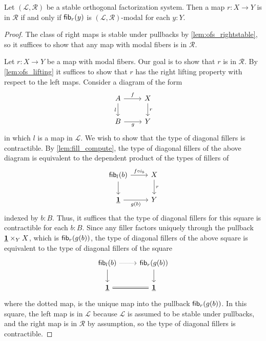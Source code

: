 \begin{lem}\label{lem:sofs_rfib}
Let $(\mathcal{L},\mathcal{R})$ be a stable orthogonal factorization system.
Then a map $r:X\to Y$ is in $\mathcal{R}$ if and only if $\mathsf{fib}_{r}(y)$
is $(\mathcal{L},\mathcal{R})$-modal for each $y:Y$.
\end{lem}

\begin{proof}
The class of right maps is stable under pullbacks by \autoref{lem:ofs_rightstable},
so it suffices to show that any map with modal fibers is in $\mathcal{R}$.

Let $r:X\to Y$ be a map with modal fibers. Our goal is to show that
$r$ is in $\mathcal{R}$. By \autoref{lem:ofs_lifting} it suffices to show that
$r$ has the right lifting property with respect to the left maps.
Consider a diagram of the form
\begin{equation*}
\begin{tikzcd}
A \arrow[d,swap,"l"] \arrow[r,"f"] & X \arrow[d,"r"] \\
B \arrow[r,swap,"g"] & Y
\end{tikzcd}
\end{equation*}
in which $l$ is a map in $\mathcal{L}$.
We wish to show that the type of diagonal fillers is contractible.
By \autoref{lem:fill_compute}, the type of diagonal fillers of the above diagram
is equivalent to the dependent product of the types of fillers of
\begin{equation*}
\begin{tikzcd}
\fib{l}{b} \arrow[d] \arrow[r,"f\circ i_b"] & X \arrow[d,"r"] \\
\unit \arrow[r,swap,"g(b)"] & Y
\end{tikzcd}
\end{equation*}
indexed by $b:B$. Thus, it suffices that the type of diagonal fillers for this
square is contractible for each $b:B$. Since any filler factors uniquely through
the pullback $\underline{\mathbf{1}}\times_Y X$, which is $\mathsf{fib}_{r}(g(b))$, the type of diagonal
fillers of the above square is equivalent to the type of diagonal fillers of the
square
\begin{equation*}
\begin{tikzcd}
\fib{l}{b} \arrow[d] \arrow[r,densely dotted] & \fib{r}{g(b)} \arrow[d] \\
\unit \arrow[r,equals] & \unit
\end{tikzcd}
\end{equation*}
where the dotted map, is the unique map into the pullback $\mathsf{fib}_{r}(g(b))$. In
this square, the left map is in $\mathcal{L}$ because $\mathcal{L}$ is assumed
to be stable under pullbacks, and the right map is in $\mathcal{R}$ by assumption,
so the type of diagonal fillers is contractible.
\end{proof}

